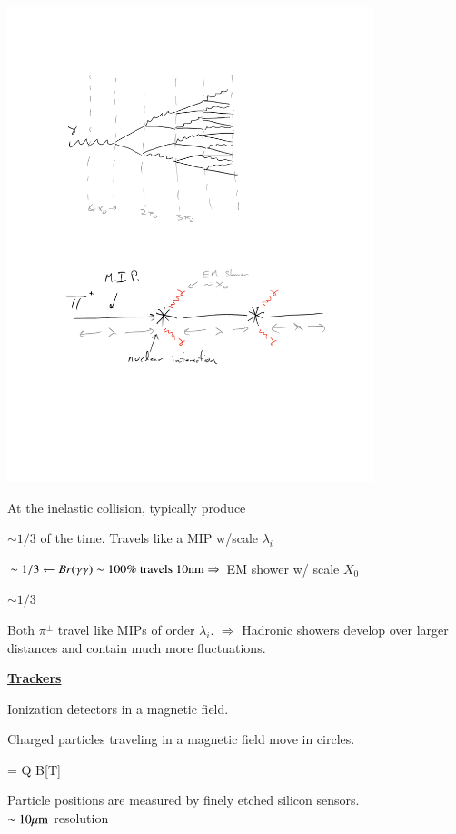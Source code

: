 {\bc
\includegraphics[width=0.8\textwidth]{./hadronicShowerNew.pdf}
\ec

At the inelastic collision, typically produce 
\bi
\item[$\pi^+$] $\sim 1/3$ of the time. Travels like a MIP w/scale $\lambda_i$
\item[$\pi^0$] $\sim 1/3 \leftarrow Br(\gamma\gamma) \sim 100\%\ \textrm{travels 10nm} \Rightarrow $ EM shower w/ scale $X_0$
\item[$\pi^-$] $\sim 1/3$ 
\ei

Both $\pi^\pm$ travel like MIPs of order $\lambda_i$.
$\Rightarrow$ Hadronic showers develop over larger distances and contain much more fluctuations.

\lineacross

\clearpage

\textbf{\underline{Trackers}}

Ionization detectors in a magnetic field.

Charged particles traveling in a magnetic field move in circles. 

\be
{} = Q \cdot B[T] \cdot {}
\ee

Particle positions are measured by finely etched silicon sensors.\\
$\sim10 \mu\textrm{m}$ resolution

}
